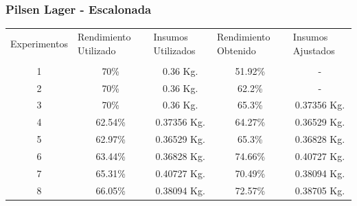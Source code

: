  \subsubsection{Pilsen Lager - Escalonada}
    
    \begin{minipage}{0.95\textwidth}    
    
        \centering
        \begin{tabularx}{\textwidth}{|X|X|X|X|X|}
             \hline
             \multicolumn{1}{|c|}{Experimentos} & \multirow{1}{2cm}{Rendimiento Utilizado} &\multirow{1}{2cm}{Insumos Utilizados}  & \multirow{1}{2cm}{Rendimiento Obtenido} &\multirow{1}{2cm}{Insumos Ajustados}\\
             & & & &\\
             \hline
             \hline
             \multicolumn{1}{|c|}{1} & \multicolumn{1}{c|}{70\%} & \multicolumn{1}{c|}{0.36 Kg.} &\multicolumn{1}{c|}{51.92\%} &\multicolumn{1}{c|}{-} \\
             \hline
             \multicolumn{1}{|c|}{2} & \multicolumn{1}{c|}{70\%}  & \multicolumn{1}{c|}{0.36 Kg.} &\multicolumn{1}{c|}{62.2\%} &\multicolumn{1}{c|}{-} \\
             \hline
             \multicolumn{1}{|c|}{3} & \multicolumn{1}{c|}{70\%} & \multicolumn{1}{c|}{0.36 Kg.} &\multicolumn{1}{c|}{65.3\%} &\multicolumn{1}{c|}{0.37356 Kg.} \\
             \hline
             \multicolumn{1}{|c|}{4} & \multicolumn{1}{c|}{62.54\%}  & \multicolumn{1}{c|}{0.37356 Kg.} &\multicolumn{1}{c|}{64.27\%} &\multicolumn{1}{c|}{0.36529 Kg.} \\
             \hline
             \multicolumn{1}{|c|}{5} & \multicolumn{1}{c|}{62.97\%}  & \multicolumn{1}{c|}{0.36529 Kg.} &\multicolumn{1}{c|}{65.3\%} &\multicolumn{1}{c|}{0.36828 Kg.} \\
             \hline
             \multicolumn{1}{|c|}{6} & \multicolumn{1}{c|}{63.44\%}  & \multicolumn{1}{c|}{0.36828 Kg.} &\multicolumn{1}{c|}{74.66\%} &\multicolumn{1}{c|}{0.40727 Kg.} \\
             \hline
             \multicolumn{1}{|c|}{7} & \multicolumn{1}{c|}{65.31\%}  & \multicolumn{1}{c|}{0.40727 Kg.} &\multicolumn{1}{c|}{70.49\%} &\multicolumn{1}{c|}{0.38094 Kg.} \\
             \hline
             \multicolumn{1}{|c|}{8} & \multicolumn{1}{c|}{66.05\%}  & \multicolumn{1}{c|}{0.38094 Kg.} &\multicolumn{1}{c|}{72.57\%} &\multicolumn{1}{c|}{0.38705 Kg.} \\

\end{tabularx}
\end{minipage}
